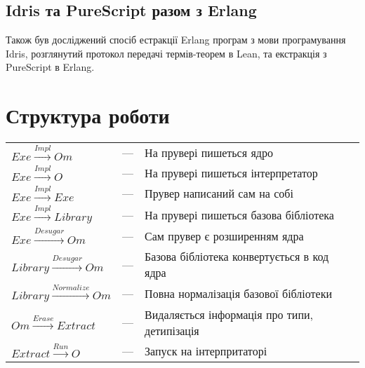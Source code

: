\subsection*{Idris та PureScript разом з Erlang}
Також був досліджений спосіб естракції Erlang програм з мови програмування
Idris, розглянутий протокол передачі термів-теорем в Lean,
та екстракція з PureScript в Erlang.


\newpage
\section{Структура роботи}

\begin{center}
\end{center}

\begin{fullwidth}
\hspace{-2cm}
\begin{tabular}{lll}
  $Exe \xrightarrow{Impl} Om$ &---& На прувері пишеться ядро \\
  $Exe \xrightarrow{Impl} O$ &---& На прувері пишеться інтерпретатор \\
  $Exe \xrightarrow{Impl} Exe$ &---& Прувер написаний сам на собі \\
  $Exe \xrightarrow{Impl} Library$ &---& На прувері пишеться базова бібліотека \\
  $Exe \xrightarrow{Desugar} Om$ &---& Сам прувер є розширенням ядра \\
  $Library \xrightarrow{Desugar} Om$ &---& Базова бібліотека конвертується в код ядра \\
  $Library \xrightarrow{Normalize} Om$ &---& Повна нормалізація базової бібліотеки \\
  $Om \xrightarrow{Erase} Extract$ &---& Видаляється інформація про типи, детипізація \\
  $Extract \xrightarrow{Run} O$ &---& Запуск на інтерпритаторі \\
\end{tabular}
\end{fullwidth}
